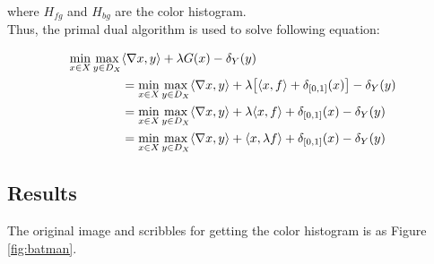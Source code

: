 \documentclass[paper=a4, fontsize=11pt]{scrartcl} %
\numberwithin{equation}{section} %
\numberwithin{figure}{section} %
\numberwithin{table}{section} %
\begin{document}
where $H_{fg}$ and $H_{bg}$ are the color histogram. \\

Thus, the primal dual algorithm is used to solve following equation:
	
\begin{align}
	\min_{x \in X} \max_{y \in D_X} & \langle \nabla x, y \rangle + \lambda G(x) - \delta_Y (y) \notag \\
	&= \min_{x \in X} \max_{y \in D_X} \langle \nabla x, y \rangle + \lambda \big[ \langle x, f \rangle + \delta_{[0, 1]}(x) \big] - \delta_Y (y)  \\
	&= \min_{x \in X} \max_{y \in D_X} \langle \nabla x, y \rangle + \lambda \langle x, f \rangle + \delta_{[0, 1]}(x) - \delta_Y (y) \\
	&= \min_{x \in X} \max_{y \in D_X} \langle \nabla x, y \rangle + \langle x, \lambda f \rangle + \delta_{[0, 1]}(x) - \delta_Y (y) 	
\end{align}

\subsection{Results}

The original image and scribbles for getting the color histogram is as Figure \ref{fig:batman}.
\end{document}
